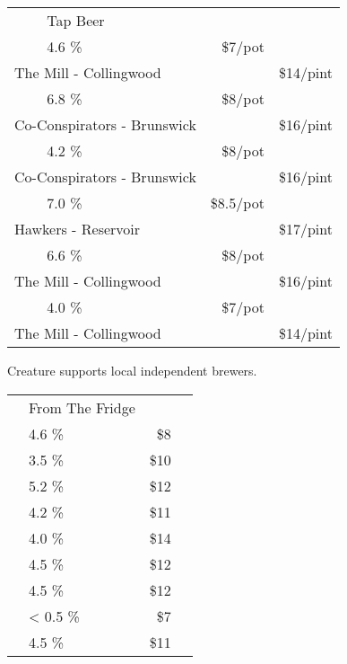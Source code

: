 \documentclass[12pt]{article}
\makeatletter
\newcommand*\ColText[1]{\textcolor{SpringGreen4}{#1}}
\newcommand*\GroupGlassTitle[2]{%
  \noalign{\vspace{2em}}
  \fontfamily{qzc}\selectfont #2 & \vspace{1em}\fontsize{20}{29}\selectfont\ColText{#1}}
\newenvironment{Group}
  {\vspace{2em}\noindent\begin{tabular*}{\textwidth}{@{} p{10mm} l@{\extracolsep{\fill}} r@{\hspace{1em}} r@{}}} %
  {\end{tabular*}}
\newcommand*\Booze[3]{%
  \noalign{\vspace{1em}}
  \multicolumn{2}{l}{ #1 \tiny\dotfill } & \scriptsize #2 \% \tiny\dotfill & \normalsize \$#3}
\newcommand*\Beer[5]{%
  \noalign{\vspace{2em}}
  \Booze{#1}{#3}{#4\tiny/pot} \\
  \multicolumn{2}{l}{ \hspace*{0.1em} \scriptsize #2 } & {} & \normalsize \$#5\tiny/pint}
\newcommand*\Glass[2]{%
    \begin{tikzpicture}[remember picture,overlay]
        \node[xshift=5mm,yshift=0mm]{%
            \texttt{[image: Glasses/\#1.png]}
        };
    \end{tikzpicture}%
}
\newcommand*\GlassWeizen{%
    \Glass{weizen}{4mm}}
\newcommand*\GlassFridge{%
    \Glass{fridge}{7.5mm}}
\makeatother
\begin{document}
%


\begin{Group}
    \GroupGlassTitle{Tap Beer}{\GlassWeizen} \\
    \Beer{Daydream \textbf{Session Ale}}{The Mill - Collingwood}{4.6}{7}{14} \\
    \Beer{The Renegade \textbf{WC IPA}}{Co-Conspirators - Brunswick}{6.8}{8}{16} \\
    \Beer{The Wheelman \textbf{Raspberry Gose}}{Co-Conspirators - Brunswick}{4.2}{8}{16} \\
    \Beer{Beneath the Trees, We Gather \textbf{Yuzu \& Plum Sour}}{Hawkers - Reservoir}{7.0}{8.5}{17} \\
    \Beer{The Dark Lord \textbf{Black IPA}}{The Mill - Collingwood}{6.6}{8}{16} \\
    \Beer{Cracking \textbf{Lager}}{The Mill - Collingwood}{4.0}{7}{14} \\
\end{Group}
\vfill
\begin{center}
	Creature supports local independent brewers.
\end{center}
\pagebreak
\begin{Group}
    \GroupGlassTitle{From The Fridge}{\GlassFridge} \\
    \Booze{Melbourne Bitter}{4.6}{8} \\
    \Booze{Bodriggy Speccy Juice \textbf{Hazy Session IPA}}{3.5}{10} \\
    \Booze{Stomping Ground \textbf{Pale Ale}}{5.2}{12} \\
    \Booze{Stomping Ground \textbf{Passionfruit Smash Sour}}{4.2}{11} \\
    \Booze{Lick Pier \textbf{Alcoholic Ginger Beer}}{4.0}{14} \\
    \Booze{Sopra Sicilian \textbf{Blood Orange Seltzer}}{4.5}{12} \\
    \Booze{Sopra Sicilian \textbf{Limoncello Seltzer}}{4.5}{12} \\
    \Booze{Hop Nation Mind Ya Head \textbf{Non Alcoholic XPA}}{< 0.5}{7} \\
    \Booze{Napoleone \& Co Louis \textbf{Hard Cider}}{4.5}{11} \\
\end{Group}
\end{document}
